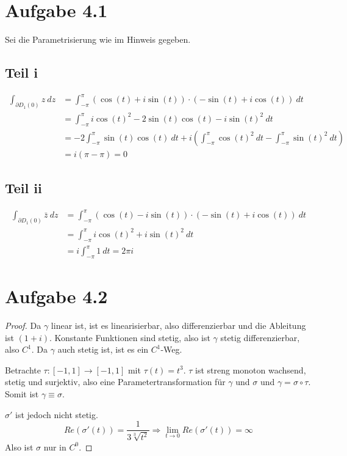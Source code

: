 \documentclass[10pt,a4paper]{article}
\begin{document}
\section{Aufgabe 4.1}

Sei die Parametrisierung wie im Hinweis gegeben.

\subsection{Teil i}

\begin{align*}
  \int_{\partial D_{1}(0)} z\ dz & = \int_{-\pi}^{\pi} (\cos(t) + i \sin(t)) \cdot (-\sin(t) + i \cos(t))\ dt\\
                                 &  = \int_{-\pi}^{\pi} i\cos(t)^{2} - 2\sin(t)\cos(t) - i\sin(t)^{2}\ dt\\
                                 &  = -2 \int_{-\pi}^{\pi} \sin(t)\cos(t)\ dt + i \left( \int_{-\pi}^{\pi} \cos(t)^{2}\ dt - \int_{-\pi}^{\pi} \sin(t)^{2}\ dt \right)\\
                                 &  = i \left( \pi - \pi \right) = 0
\end{align*}

\subsection{Teil ii}

\begin{align*}
  \int_{\partial D_{1}(0)} \bar{z}\ dz & = \int_{-\pi}^{\pi} (\cos(t) - i \sin(t)) \cdot (-\sin(t) + i \cos(t))\ dt\\
                                 &  = \int_{-\pi}^{\pi} i\cos(t)^{2} + i\sin(t)^{2}\ dt\\
                                 &  = i\int_{-\pi}^{\pi} 1\ dt = 2\pi i
\end{align*}

\section{Aufgabe 4.2}

\begin{proof}
  Da $\gamma$ linear ist, ist es linearisierbar, also differenzierbar und die
  Ableitung ist $(1 + i)$. Konstante Funktionen sind stetig, also ist $\gamma$
  stetig differenzierbar, also $C^{1}$. Da $\gamma$ auch stetig ist, ist es ein
  $C^{1}$-Weg.

  Betrachte $\tau : [-1, 1] \to [-1, 1]$ mit $\tau(t) = t^{3}$. $\tau$ ist
  streng monoton wachsend, stetig und surjektiv, also eine
  Parametertransformation für $\gamma$ und $\sigma$ und
  $\gamma = \sigma \circ \tau$. Somit ist $\gamma \equiv \sigma$.

  $\sigma'$ ist jedoch nicht stetig.
  \begin{equation*}
    Re(\sigma'(t)) = \frac{1}{3\sqrt[3]{t^{2}}} \Rightarrow \lim_{t \to 0} Re(\sigma'(t)) = \infty
  \end{equation*}
  Also ist $\sigma$ nur in $C^{0}$.
\end{proof}
\end{document}
